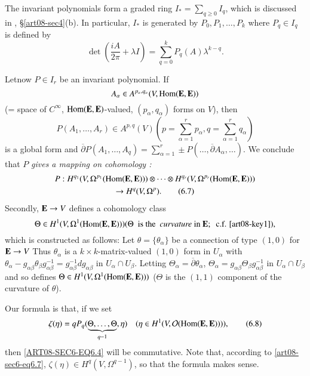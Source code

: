 The invariant polynomials form a graded ring $I_{*}=\sum\limits_{q\geq 0}I_{q}$, which is discussed in \cite{art08-key11}, \S\ref{art08-sec4}(b). In particular, $I_{*}$ is generated by $P_{0},P_{1},\ldots,P_{k}$ where $P_{q}\in I_{q}$ is defined by
\begin{equation*}
\det\left(\dfrac{iA}{2\pi}+\lambda I\right)=\sum\limits^{k}_{q=0}P_{q}(A)\lambda^{k-q}.\tag{6.6}\label{art08-sec6-eq6.6}
\end{equation*}

Let\pageoriginale now $P\in I_{r}$ be an invariant polynomial. If
$$
A_{\alpha}\in A^{p_{\alpha},q_{\alpha}}(V,\operatorname{\mathrm{Hom}}(\mathbf{E},\mathbf{E}))
$$
(= space of $C^{\infty}$, $\operatorname{\mathrm{Hom}}(\mathbf{E},\mathbf{E})$-valued, $(p_{\alpha},q_{\alpha})$ forms on $V$), then 
$$
P(A_{1},\ldots,A_{r})\in A^{p,q}(V)\left(p=\sum\limits^{r}_{\alpha=1}p_{\alpha},q=\sum\limits^{r}_{\alpha=1}q_{\alpha}\right)
$$ 
is a global form and $\overline{\partial}P(A_{1},\ldots,A_{q})=\sum\limits^{r}_{\alpha=1}\pm P(\ldots,\overline{\partial}A_{\alpha},\ldots)$. We conclude that $P$ {\em gives a mapping on cohomology :}
\begin{gather*}
P : H^{q_{1}}(V,\Omega^{p_{1}}(\operatorname{\mathrm{Hom}}(\mathbf{E},\mathbf{E})))\otimes\cdots\otimes H^{q_{r}}(V,\Omega^{p_{r}}(\operatorname{\mathrm{Hom}}(\mathbf{E},\mathbf{E})))\\
\to H^{q}(V,\Omega^{p}).\tag{6.7}\label{art08-sec6-eq6.7}
\end{gather*}
Secondly, $\mathbf{E}\to V$ defines a cohomology class
$$
\Theta\in H^{1}(V,\Omega^{1}(\operatorname{\mathrm{Hom}}(\mathbf{E},\mathbf{E}))) (\Theta \text{~ is the~ {\em curvature} in } \mathbf{E};\text{~ c.f. \cite{art08-key1}}),
$$
which is constructed as follows: Let $\theta=\{\theta_{\alpha}\}$ be a connection of type $(1,0)$ for $\mathbf{E}\to V$ Thus $\theta_{\alpha}$ is a $k\times k$-matrix-valued $(1,0)$ form in $U_{\alpha}$ with $\theta_{\alpha}-g_{\alpha\beta}\theta_{\beta}g^{-1}_{\alpha\beta}=g^{-1}_{\alpha\beta}dg_{\alpha\beta}$ in $U_{\alpha}\cap U_{\beta}$. Letting $\Theta_{\alpha}=\overline{\partial}\theta_{\alpha}$, $\Theta_{\alpha}=g_{\alpha\beta}\Theta_{\beta}g^{-1}_{\alpha\beta}$ in $U_{\alpha}\cap U_{\beta}$ and so defines $\Theta\in H^{1}(V,\Omega^{1}(\operatorname{\mathrm{Hom}}(\mathbf{E},\mathbf{E})))$ ($\Theta$ is the $(1,1)$ component of the curvature of $\theta$).

Our formula is that, if we set
\begin{equation*}
\zeta(\eta)=qP_{q}(\underbrace{\Theta,\ldots,\Theta}_{q-1},\eta)\quad (\eta\in H^{1}(V,\mathcal{O}(\operatorname{\mathrm{Hom}}(\mathbf{E},\mathbf{E})))),\tag{6.8}\label{ART08-SEC6-EQ6.8}
\end{equation*}
then \eqref{ART08-SEC6-EQ6.4} will be commutative. Note that, according to \eqref{art08-sec6-eq6.7}, $\zeta(\eta)\in H^{q}(V,\Omega^{q-1})$, so that the formula makes sense.

